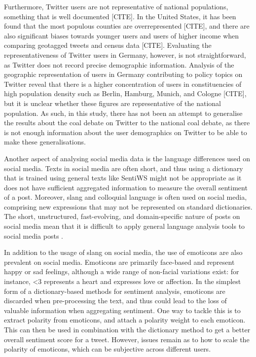 \documentclass[12pt,onecolumn,twoside]{layout}
\begin{document}
Furthermore, Twitter users are not representative of national populations, something that is well documented [CITE]. In the United States, it has been found that the most populous counties are overrepresented [CITE], and there are also significant biases towards younger users and users of higher income when comparing geotagged tweets and census data [CITE]. Evaluating the representativeness of Twitter users in Germany, however, is not straightforward, as Twitter does not record precise demographic information. Analysis of the geographic representation of users in Germany contributing to policy topics on Twitter reveal that there is a higher concentration of users in constituencies of high population density such as Berlin, Hamburg, Munich, and Cologne [CITE], but it is unclear whether these figures are representative of the national population. As such, in this study, there has not been an attempt to generalise the results about the coal debate on Twitter to the national coal debate, as there is not enough information about the user demographics on Twitter to be able to make these generalisations. 

Another aspect of analysing social media data is the language differences used on social media. Texts in social media are often short, and thus using a dictionary that is trained using general texts like SentiWS might not be appropriate as it does not have sufficient aggregated information to measure the overall sentiment of a post. Moreover, slang and colloquial language is often used on social media, comprising new expressions that may not be represented on standard dictionaries. The short, unstructured, fast-evolving, and domain-specific nature of posts on social media mean that it is difficult to apply general language analysis tools to social media posts \cite{Hu2013}. 

In addition to the usage of slang on social media, the use of emoticons are also prevalent on social media. Emoticons are primarily face-based and represent happy or sad feelings, although a wide range
of non-facial variations exist: for instance, <3 represents a heart and expresses love or affection. In the simplest form of a dictionary-based methods for sentiment analysis, emoticons are discarded when pre-processing the text, and thus could lead to the loss of valuable information when aggregating sentiment. One way to tackle this is to extract polarity from emoticons, and attach a polarity weight to each emoticon. This can then be used in combination with the dictionary method to get a better overall sentiment score for a tweet. However, issues remain as to how to scale the polarity of emoticons, which can be subjective across different users. 
\end{document}
